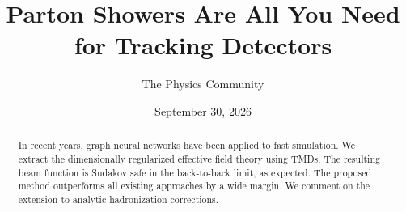 \documentclass[11pt]{article}
\title{Parton Showers Are All You Need for Tracking Detectors}
\author{The Physics Community}
\date{September 30, 2026}
\numberwithin{equation}{section}
\theoremstyle{definition}
\theoremstyle{remark}
\begin{document}
\maketitle
\begin{abstract}
In recent years, graph neural networks have been applied to fast
simulation. We extract the dimensionally regularized effective field
theory using TMDs. The resulting beam function is Sudakov safe in the
back-to-back limit, as expected. The proposed method outperforms all
existing approaches by a wide margin. We comment on the extension to
analytic hadronization corrections.
\end{abstract}
\tableofcontents




\nocite{*}


\end{document}
